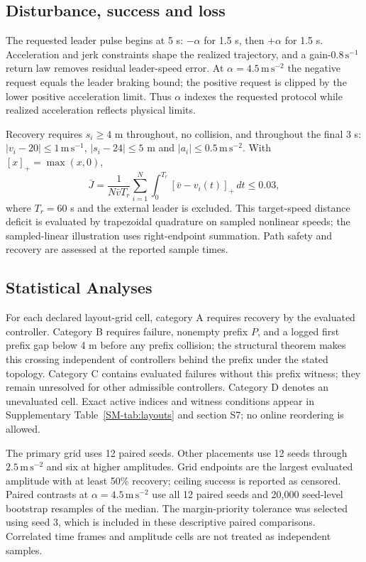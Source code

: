 \documentclass[12pt]{article}
\begin{document}
\subsection*{Disturbance, success and loss}
The requested leader pulse begins at 5 s: $-\alpha$ for 1.5 s, then $+\alpha$ for 1.5 s. Acceleration and jerk constraints shape the realized trajectory, and a gain-$0.8\,\mathrm{s^{-1}}$ return law removes residual leader-speed error. At $\alpha=4.5\,\mathrm{m\,s^{-2}}$ the negative request equals the leader braking bound; the positive request is clipped by the lower positive acceleration limit. Thus $\alpha$ indexes the requested protocol while realized acceleration reflects physical limits.

Recovery requires $s_i\ge4$ m throughout, no collision, and throughout the final 3 s: $|v_i-20|\le1\,\mathrm{m\,s^{-1}}$, $|s_i-24|\le5$ m and $|a_i|\le0.5\,\mathrm{m\,s^{-2}}$. With $[x]_+=\max(x,0)$,
\begin{equation}
\bar J=\frac{1}{N\bar vT_r}\sum_{i=1}^{N}\int_0^{T_r}[\bar v-v_i(t)]_+\,dt\le0.03,
\end{equation}
where $T_r=60$ s and the external leader is excluded. This target-speed distance deficit is evaluated by trapezoidal quadrature on sampled nonlinear speeds; the sampled-linear illustration uses right-endpoint summation. Path safety and recovery are assessed at the reported sample times.

\subsection*{Statistical Analyses}
For each declared layout-grid cell, category A requires recovery by the evaluated controller. Category B requires failure, nonempty prefix $P$, and a logged first prefix gap below 4 m before any prefix collision; the structural theorem makes this crossing independent of controllers behind the prefix under the stated topology. Category C contains evaluated failures without this prefix witness; they remain unresolved for other admissible controllers. Category D denotes an unevaluated cell. Exact active indices and witness conditions appear in Supplementary Table~\ref{SM-tab:layouts} and section S7; no online reordering is allowed.

The primary grid uses 12 paired seeds. Other placements use 12 seeds through $2.5\,\mathrm{m\,s^{-2}}$ and six at higher amplitudes. Grid endpoints are the largest evaluated amplitude with at least 50\% recovery; ceiling success is reported as censored. Paired contrasts at $\alpha=4.5\,\mathrm{m\,s^{-2}}$ use all 12 paired seeds and 20,000 seed-level bootstrap resamples of the median. The margin-priority tolerance was selected using seed 3, which is included in these descriptive paired comparisons. Correlated time frames and amplitude cells are not treated as independent samples.
\end{document}

